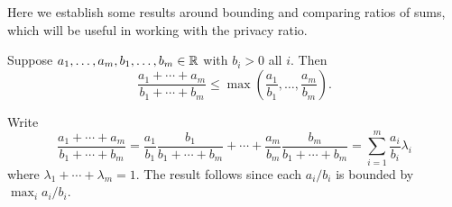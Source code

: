 \documentclass[11pt,draft]{article}
\begin{document}
Here we establish some results around bounding and comparing ratios of sums, which will be useful in working with the privacy ratio.


\begin{lem} \label{lem:rsbound}
Suppose $a_1,\dots,a_m,b_1,\dots,b_m \in \mathbb{R}$ with $b_i > 0$ all $i$.
Then 
\[ \frac{a_1 + \cdots + a_m}{b_1 + \cdots + b_m} \leq
\max\left(\frac{a_1}{b_1},\dots,\frac{a_m}{b_m}\right). \]
\end{lem}
\begin{pf}
Write
\[ \frac{a_1 + \cdots + a_m}{b_1 + \cdots + b_m}
= \frac{a_1}{b_1}\frac{b_1}{b_1+\cdots+b_m} +
\cdots + \frac{a_m}{b_m}\frac{b_m}{b_1+\cdots+b_m} =
\sum_{i=1}^m \frac{a_i}{b_i} \lambda_i
\]
where $\lambda_1 + \cdots + \lambda_m = 1$.
The result follows since each $a_i/b_i$ is bounded by $\max_i a_i/b_i$.
\end{pf}

\end{document}
